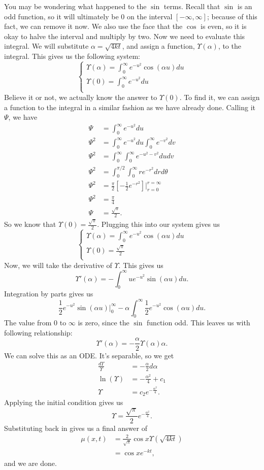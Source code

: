 \documentclass{article}
\begin{document}
You may be wondering what happened to the $\sin$ terms. Recall that $\sin$ is an odd function, so it will ultimately be $0$ on the interval $[-\infty,\infty]$; because of this fact, we can remove it now. We also use the face that the $\cos$ is even, so it is okay to halve the interval and multiply by two. Now we need to evaluate this integral. We will substitute $\alpha = \sqrt{4kt}$, and assign a function, $\Upsilon(\alpha)$, to the integral. This gives us the following system:
\[
\begin{cases}
\Upsilon(\alpha) = \int_{0}^{\infty}e^{-u^{2}}\cos{(\alpha u)}du\\
\Upsilon(0) = \int_{0}^{\infty}e^{-u^{2}}du\\
\end{cases}
\]
Believe it or not, we actually know the answer to $\Upsilon(0)$. To find it, we can assign a function to the integral in a similar fashion as we have already done. Calling it $\Psi$, we have
\begin{align*}
\Psi &= \int_{0}^{\infty}e^{-u^{2}}du\\
\Psi^{2} &= \int_{0}^{\infty}e^{-u^{2}}du \int_{0}^{\infty}e^{-v^{2}}dv\\
\Psi^{2} &= \int_{0}^{\infty}\int_{0}^{\infty}e^{-u^{2}-v^{2}}dudv\\
\Psi^{2} &= \int_{0}^{\pi/2}\int_{0}^{\infty}re^{-r^{2}}drd\theta\\
\Psi^{2} &= \frac{\pi}{2}\left[-\frac{1}{2}e^{-r^{2}}\right]\Bigg |_{r=0}^{r=\infty}\\
\Psi^{2} &= \frac{\pi}{4}\\
\Psi &= \frac{\sqrt{\pi}}{2}.
\end{align*}
So we know that $\Upsilon(0) = \frac{\sqrt{\pi}}{2}$. Plugging this into our system gives us
\[
\begin{cases}
\Upsilon(\alpha) = \int_{0}^{\infty}e^{-u^{2}}\cos{(\alpha u)}du\\
\Upsilon(0) = \frac{\sqrt{\pi}}{2}\\
\end{cases}
\]
Now, we will take the derivative of $\Upsilon$. This gives us
\[
\Upsilon'(\alpha) = -\int_{0}^{\infty}ue^{-u^{2}}\sin{(\alpha u)}du.
\]
Integration by parts gives us
\[
\frac{1}{2}e^{-u^{2}}\sin{(\alpha u)}\Big |_{0}^{\infty} - \alpha\int_{0}^{\infty}\frac{1}{2}e^{-u^{2}}\cos{(\alpha u)}du.
\]
The value from $0$ to $\infty$ is zero, since the $\sin$ function odd. This leaves us with following relationship:
\[
\Upsilon'(\alpha) = -\frac{\alpha}{2}\Upsilon(\alpha) \alpha.
\]
We can solve this as an ODE. It's separable, so we get
\begin{align*}
\frac{d\Upsilon}{\Upsilon} &= -\frac{\alpha}{2}d\alpha\\
\ln{(\Upsilon)} &= -\frac{\alpha^{2}}{4} + c_{1}\\
\Upsilon &= c_{2}e^{-\frac{\alpha^{2}}{4}}.
\end{align*}
Applying the initial condition gives us
\[
\Upsilon = \frac{\sqrt{\pi}}{2}e^{-\frac{\alpha^{2}}{4}}.
\]
Substituting back in gives us a final answer of
\begin{align*}
\mu(x,t) &= \frac{2}{\sqrt{\pi}}\cos{x}\Upsilon(\sqrt{4kt})\\
&= \cos{x}e^{-kt},
\end{align*}
and we are done.
\end{document}
